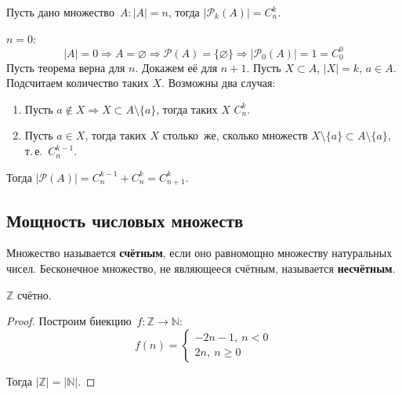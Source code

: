 \begin{theorem}
Пусть дано множество~$A \colon |A| = n$, тогда $|\mathcal P_k(A)| = C_n^k$.
\end{theorem}
\begin{proofmathind}
	\indbase $n = 0$:
	\begin{equation*}
	|A| = 0 \Rightarrow A = \varnothing \Rightarrow \mathcal P(A) = \{ \varnothing \} \Rightarrow
	|\mathcal P_0(A)| = 1 = C_0^0
	\end{equation*}
	\indstep Пусть теорема верна для $n$.
	Докажем её для $n + 1$.
	Пусть $X \subset A$, $|X| = k$, $a \in A$.
	Подсчитаем количество таких $X$.
	Возможны два случая:
	\begin{enumerate}
		\item Пусть $a \notin X \Rightarrow X \subset A \setminus \{ a \}$, тогда таких $X$ $C_n^k$.
		\item Пусть $a \in X$, тогда таких $X$ столько~же, сколько множеств
		$X \setminus \{ a \} \subset A \setminus \{ a \}$, т.\,е.~$C_n^{k-1}$.
	\end{enumerate}

	Тогда $|\mathcal P(A)| = C_n^{k-1} + C_n^k = C_{n+1}^k$. \indend
\end{proofmathind}

\subsection{Мощность числовых множеств}
Множество называется \textbf{счётным}, если оно равномощно множеству натуральных чисел.
Бесконечное множество, не являющееся счётным, называется \textbf{несчётным}.

\begin{statement}
$\mathbb Z$ счётно.
\end{statement}
\begin{proof}
Построим биекцию~$f \colon \mathbb Z \to \mathbb N$:
\begin{equation*}
f(n) =
\begin{cases}
-2n - 1, \ n < 0 \\
2n, \ n \geqslant 0
\end{cases}
\end{equation*}

Тогда $|\mathbb Z| = |\mathbb N|$.
\end{proof}

